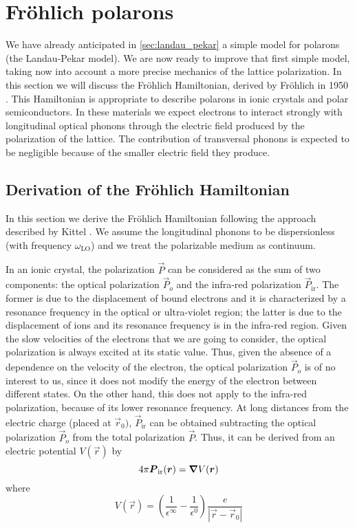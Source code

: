 \section{Fr\"{o}hlich polarons}
We have already anticipated in \cref{sec:landau_pekar} a simple model for polarons (the Landau-Pekar model). We are now ready to improve that first simple model, taking now into account a more precise mechanics of the lattice polarization. In this section we will discuss the Fr\"ohlich Hamiltonian, derived by Fr\"{o}hlich in 1950 \cite{frohlich1950}. This Hamiltonian is appropriate to describe polarons in ionic crystals and polar semiconductors. In these materials we expect electrons to interact strongly with longitudinal optical phonons through the electric field produced by the polarization of the lattice. The contribution of transversal phonons is expected to be negligible because of the smaller electric field they produce.

\subsection{Derivation of the Fr\"{o}hlich Hamiltonian}
In this section we derive the Fr\"{o}hlich Hamiltonian following the approach described by Kittel \cite{kittel1987}. We assume the longitudinal phonons to be dispersionless (with frequency $\omega_\text{LO}$) and we treat the polarizable medium as continuum.

In an ionic crystal, the polarization $\vec{P}$ can be considered as the sum of two components: the optical polarization $\vec{P}_o$ and the infra-red polarization $\vec{P}_\text{ir}$. The former is due to the displacement of bound electrons and it is characterized by a resonance frequency in the optical or ultra-violet region; the latter is due to the displacement of ions and its resonance frequency is in the infra-red region. Given the slow velocities of the electrons that we are going to consider, the optical polarization is always excited at its static value. Thus, given the absence of a dependence on the velocity of the electron, the optical polarization $\vec{P}_o$ is of no interest to us, since it does not modify the energy of the electron between different states. On the other hand, this does not apply to the infra-red polarization, because of its lower resonance frequency. At long distances from the electric charge (placed at $\vec{r}_0)$, $\vec{P}_\text{ir}$ can be obtained subtracting the optical polarization $\vec{P}_o$ from the total polarization $\vec{P}$. Thus, it can be derived from an electric potential $V(\vec{r})$ by
\begin{equation} \label{eq:polarization_potential}
    4\pi\mathbf{\boldsymbol{P}}_\text{ir}(\mathbf{\boldsymbol{r}}) = \grad V(\mathbf{\boldsymbol{r}})
\end{equation}
where
\begin{equation}
    V(\vec{r}) = \left( \frac{1}{\epsilon^\infty} - \frac{1}{\epsilon^0}\right) \frac{e}{|\vec{r}-\vec{r}_0|}
\end{equation}

